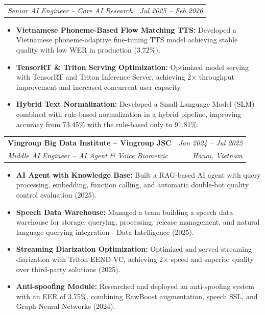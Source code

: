 \documentclass[10pt,a4paper]{article}
\makeatletter
\newcommand{\cventry}[4]{%
  \noindent
  \begin{tabular*}{\linewidth}{@{}l@{\extracolsep{\fill}}r@{}}
    {\color{accent}\textbf{#1}} & \textit{\small #2} \\
    \textit{\small #3} & \textit{\small #4}
  \end{tabular*}%
  \vspace{1pt}%
}
\newcommand{\cvsubrole}[2]{%
  \noindent
  \begin{tabular*}{\linewidth}{@{}l@{\extracolsep{\fill}}r@{}}
    \textit{\small #1} & \textit{\small #2}
  \end{tabular*}%
  \vspace{1pt}%
}
\makeatother
\begin{document}
\vspace{2pt}
\cvsubrole{Senior AI Engineer -- Core AI Research}{Jul 2025 -- Feb 2026}
\begin{itemize}
  \item \textbf{Vietnamese Phoneme-Based Flow Matching TTS:} Developed a Vietnamese phoneme-adaptive fine-tuning TTS model achieving stable quality with low WER in production (3.72\%).
  \item \textbf{TensorRT \& Triton Serving Optimization:} Optimized model serving with TensorRT and Triton Inference Server, achieving 2$\times$ throughput improvement and increased concurrent user capacity.
  \item \textbf{Hybrid Text Normalization:} Developed a Small Language Model (SLM) combined with rule-based normalization in a hybrid pipeline, improving accuracy from 73.45\% with the rule-based only to 91.81\%.
\end{itemize}

\vspace{4pt}

\cventry{Vingroup Big Data Institute -- Vingroup JSC}{Jan 2024 -- Jul 2025}
        {Middle AI Engineer -- AI Agent \& Voice Biometric}{Hanoi, Vietnam}
\begin{itemize}
  \item \textbf{AI Agent with Knowledge Base:} Built a RAG-based AI agent with query processing, embedding, function calling, and automatic double-bot quality control evaluation (2025).
  \item \textbf{Speech Data Warehouse:} Managed a team building a speech data warehouse for storage, querying, processing, release management, and natural language querying integration - Data Intelligence (2025).
  \item \textbf{Streaming Diarization Optimization:} Optimized and served streaming diarization with Triton EEND-VC, achieving 2$\times$ speed and superior quality over third-party solutions (2025).
  \item \textbf{Anti-spoofing Module:} Researched and deployed an anti-spoofing system with an EER of 3.75\%, combining RawBoost augmentation, speech SSL, and Graph Neural Networks (2024).
\end{itemize}
\end{document}
